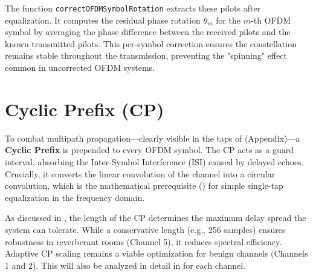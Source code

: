The function \texttt{correctOFDMSymbolRotation} extracts these pilots after equalization.
It computes the residual phase rotation $\theta_m$ for the $m$-th OFDM symbol by averaging the phase difference between the received pilots and the known transmitted pilots.
This per-symbol correction ensures the constellation remains stable throughout the transmission, preventing the "spinning" effect common in uncorrected OFDM systems.

\section{Cyclic Prefix (CP)} \label{sec:CP}

To combat multipath propagation—clearly visible in the taps of  (Appendix)—a \textbf{Cyclic Prefix} is prepended to every OFDM symbol.
The CP acts as a guard interval, absorbing the Inter-Symbol Interference (ISI) caused by delayed echoes.
Crucially, it converts the linear convolution of the channel into a circular convolution, which is the mathematical prerequisite (\autocite{NeePrasad2000}) for simple single-tap equalization in the frequency domain.

As discussed in , the length of the CP determines the maximum delay spread the system can tolerate.
While a conservative length (e.g., 256 samples) ensures robustness in reverberant rooms (Channel 5), it reduces spectral efficiency.
Adaptive CP scaling remains a viable optimization for benign channels (Channels 1 and 2). This will also be analyzed in detail in  for each channel.